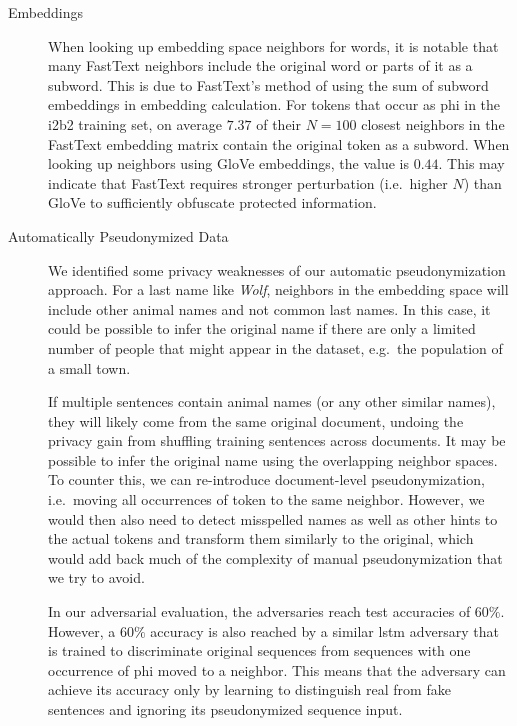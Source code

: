 \begin{description}
    \item[Embeddings]
    When looking up embedding space neighbors for words, it is notable that many FastText neighbors include the original word or parts of it as a subword.
    This is due to FastText's method of using the sum of subword embeddings in embedding calculation.
    For tokens that occur as \ac{phi} in the i2b2 training set, on average $7.37$ of their $N=100$ closest neighbors in the FastText embedding matrix contain the original token as a subword.
    When looking up neighbors using GloVe embeddings, the value is $0.44$.
    This may indicate that FastText requires stronger perturbation (i.e.\ higher $N$) than GloVe to sufficiently obfuscate protected information.
    
    \item[Automatically Pseudonymized Data]
    We identified some privacy weaknesses of our automatic pseudonymization approach.
    For a last name like \textit{Wolf}, neighbors in the embedding space will include other animal names and not common last names.
    In this case, it could be possible to infer the original name if there are only a limited number of people that might appear in the dataset, e.g.\ the population of a small town.
    
    If multiple sentences contain animal names (or any other similar names), they will likely come from the same original document, undoing the privacy gain from shuffling training sentences across documents.
    It may be possible to infer the original name using the overlapping neighbor spaces.
    To counter this, we can re-introduce document-level pseudonymization, i.e.\ moving all occurrences of  token to the same neighbor.
    However, we would then also need to detect misspelled names as well as other hints to the actual tokens and transform them similarly to the original, which would add back much of the complexity of manual pseudonymization that we try to avoid.
    
    In our adversarial evaluation, the adversaries reach test accuracies of $60\%$.
    However, a $60\%$ accuracy is also reached by a similar \ac{lstm} adversary that is trained to discriminate original sequences from sequences with one occurrence of \ac{phi} moved to a neighbor.
    This means that the adversary can achieve its accuracy only by learning to distinguish real from fake sentences and ignoring its pseudonymized sequence input.
    

\end{description}
